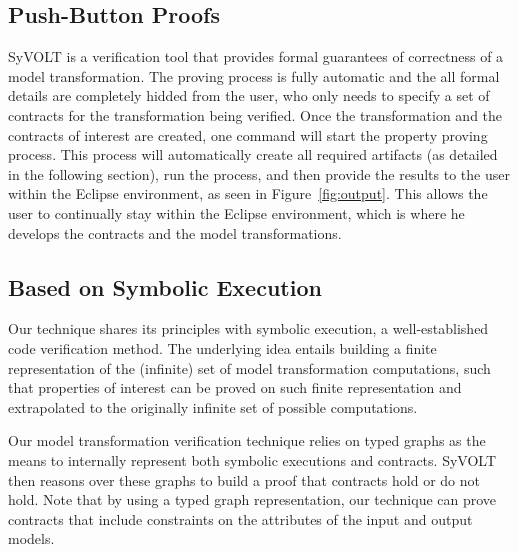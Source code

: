 \subsection{Push-Button Proofs}
\label{sec:push_button_proofs}

SyVOLT is a verification tool that provides formal guarantees of correctness of
a model transformation. The
proving process is fully automatic and the all formal details are completely
hidded from the user, who only needs to specify a set of contracts for the
transformation being verified. Once the transformation and the contracts of
interest are created, one command will start the property proving process. This
process will automatically create all required artifacts (as detailed in the
following section), run the process, and then provide the results to the user
within the Eclipse environment, as seen in Figure~\ref{fig:output}. This allows
the user to continually stay within the Eclipse environment, which is where he
develops the contracts and the model transformations.


\subsection{Based on Symbolic Execution}

Our technique shares its principles with
symbolic execution, a well-established code verification method.
The underlying idea entails building a finite representation of the (infinite)
set of model transformation computations, such that properties of interest can
be proved on
such finite representation and extrapolated to the originally infinite set of possible
computations.

Our model transformation verification technique relies on typed graphs as the
means to internally represent both symbolic executions and contracts. SyVOLT
then reasons over these graphs to build a proof that contracts hold or do not
hold. Note that by using a typed graph representation, our technique can prove
contracts that include constraints on the attributes of the input and output
models. 

